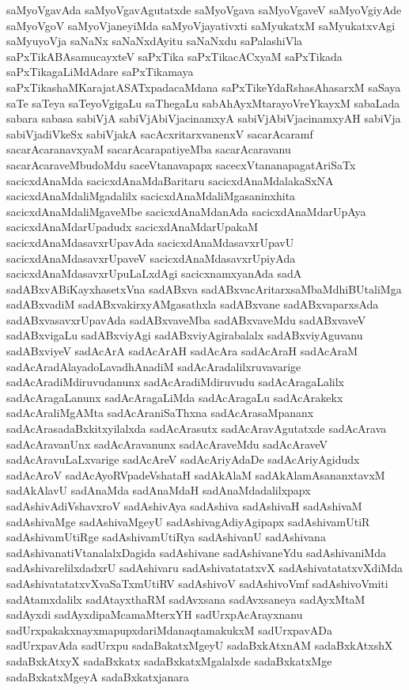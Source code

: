 {saMyoVgavAda
saMyoVgavAgutatxde
saMyoVgava
saMyoVgaveV
saMyoVgiyAde
saMyoVgoV
saMyoVjaneyiMda
saMyoVjayativxti
saMyukatxM
saMyukatxvAgi
saMyuyoVja
saNaNx
saNaNxdAyitu
saNaNxdu
saPalashiVla
saPxTikABAsamucayxteV
saPxTika
saPxTikacACxyaM
saPxTikada
saPxTikagaLiMdAdare
saPxTikamaya
saPxTikashaMKarajatASATxpadacaMdana
saPxTikeYdaRshasAhasarxM
saSaya
saTe
saTeya
saTeyoVgigaLu
saThegaLu
sabAhAyxMtarayoVreYkayxM
sabaLada
sabara
sabasa
sabiVjA
sabiVjAbiVjacinamxyA
sabiVjAbiVjacinamxyAH
sabiVja
sabiVjadiVkeSx
sabiVjakA
sacAcxritarxvanenxV
sacarAcaramf
sacarAcaranavxyaM
sacarAcarapatiyeMba
sacarAcaravanu
sacarAcaraveMbudoMdu
saceVtanavapapx
sacecxVtananapagatAriSaTx
sacicxdAnaMda
sacicxdAnaMdaBaritaru
sacicxdAnaMdalakaSxNA
sacicxdAnaMdaliMgadalilx
sacicxdAnaMdaliMgasaninxhita
sacicxdAnaMdaliMgaveMbe
sacicxdAnaMdanAda
sacicxdAnaMdarUpAya
sacicxdAnaMdarUpadudx
sacicxdAnaMdarUpakaM
sacicxdAnaMdasavxrUpavAda
sacicxdAnaMdasavxrUpavU
sacicxdAnaMdasavxrUpaveV
sacicxdAnaMdasavxrUpiyAda
sacicxdAnaMdasavxrUpuLaLxdAgi
sacicxnamxyanAda
sadA
sadABxvABiKayxhasetxVna
sadABxva
sadABxvacAritarxsaMbaMdhiBUtaliMga
sadABxvadiM
sadABxvakirxyAMgasathxla
sadABxvane
sadABxvaparxsAda
sadABxvasavxrUpavAda
sadABxvaveMba
sadABxvaveMdu
sadABxvaveV
sadABxvigaLu
sadABxviyAgi
sadABxviyAgirabalalx
sadABxviyAguvanu
sadABxviyeV
sadAcArA
sadAcArAH
sadAcAra
sadAcAraH
sadAcAraM
sadAcAradAlayadoLavadhAnadiM
sadAcAradalilxruvavarige
sadAcAradiMdiruvudanunx
sadAcAradiMdiruvudu
sadAcAragaLalilx
sadAcAragaLanunx
sadAcAragaLiMda
sadAcAragaLu
sadAcArakekx
sadAcAraliMgAMta
sadAcAraniSaThxna
sadAcArasaMpananx
sadAcArasadaBxkitxyilalxda
sadAcArasutx
sadAcAravAgutatxde
sadAcArava
sadAcAravanUnx
sadAcAravanunx
sadAcAraveMdu
sadAcAraveV
sadAcAravuLaLxvarige
sadAcAreV
sadAcAriyAdaDe
sadAcAriyAgidudx
sadAcAroV
sadAcAyoRVpadeVshataH
sadAkAlaM
sadAkAlamAsananxtavxM
sadAkAlavU
sadAnaMda
sadAnaMdaH
sadAnaMdadalilxpapx
sadAshivAdiVshavxroV
sadAshivAya
sadAshiva
sadAshivaH
sadAshivaM
sadAshivaMge
sadAshivaMgeyU
sadAshivagAdiyAgipapx
sadAshivamUtiR
sadAshivamUtiRge
sadAshivamUtiRya
sadAshivanU
sadAshivana
sadAshivanatiVtanalalxDagida
sadAshivane
sadAshivaneYdu
sadAshivaniMda
sadAshivarelilxdadxrU
sadAshivaru
sadAshivatatatxvX
sadAshivatatatxvXdiMda
sadAshivatatatxvXvaSaTxmUtiRV
sadAshivoV
sadAshivoVmf
sadAshivoVmiti
sadAtamxdalilx
sadAtayxthaRM
sadAvxsana
sadAvxsaneya
sadAyxMtaM
sadAyxdi
sadAyxdipaMcamaMterxYH
sadUrxpAcArayxnanu
sadUrxpakakxnayxmapupxdariMdanaqtamakukxM
sadUrxpavADa
sadUrxpavAda
sadUrxpu
sadaBakatxMgeyU
sadaBxkAtxnAM
sadaBxkAtxshX
sadaBxkAtxyX
sadaBxkatx
sadaBxkatxMgalalxde
sadaBxkatxMge
sadaBxkatxMgeyA
sadaBxkatxjanara
}
